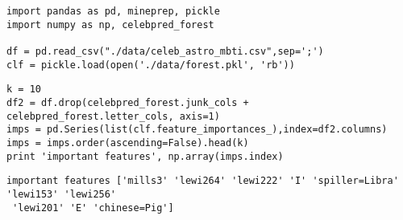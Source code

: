 \documentclass[12pt,fleqn]{article}\usepackage{../common}
\begin{document}
\begin{verbatim}
import pandas as pd, mineprep, pickle
import numpy as np, celebpred_forest

df = pd.read_csv("./data/celeb_astro_mbti.csv",sep=';')
clf = pickle.load(open('./data/forest.pkl', 'rb'))
\end{verbatim}


\begin{verbatim}
k = 10
df2 = df.drop(celebpred_forest.junk_cols + celebpred_forest.letter_cols, axis=1)
imps = pd.Series(list(clf.feature_importances_),index=df2.columns)
imps = imps.order(ascending=False).head(k)
print 'important features', np.array(imps.index)
\end{verbatim}

\begin{verbatim}
important features ['mills3' 'lewi264' 'lewi222' 'I' 'spiller=Libra' 'lewi153' 'lewi256'
 'lewi201' 'E' 'chinese=Pig']
\end{verbatim}
\end{document}
